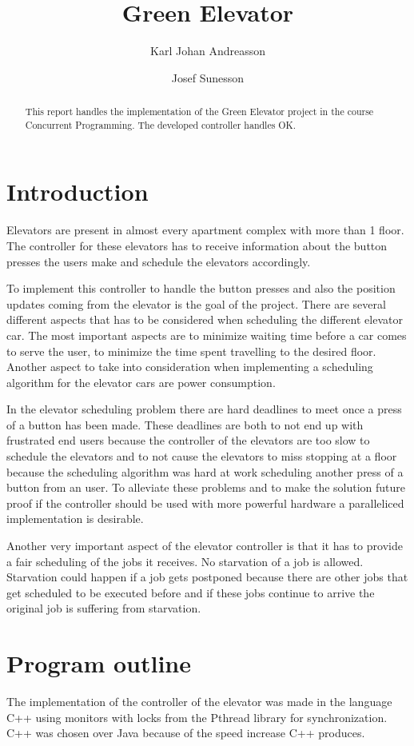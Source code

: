 \documentclass[10pt,a4paper]{article}
\author{Karl Johan Andreasson \and Josef Sunesson}
\title{Green Elevator}
\begin{document}
\maketitle

\begin{abstract} 
This report handles the implementation of the Green Elevator project in the course Concurrent Programming. The developed controller handles OK.
\end{abstract}

\section{Introduction}
Elevators are present in almost every apartment complex with more than 1 floor. The controller for these elevators has to receive information about the button presses the users make and schedule the elevators accordingly.

To implement this controller to handle the button presses and also the position updates coming from the elevator is the goal of the project. There are several different aspects that has to be considered when scheduling the different elevator car. The most important aspects are to minimize waiting time before a car comes to serve the user, to minimize the time spent travelling to the desired floor. Another aspect to take into consideration when implementing a scheduling algorithm for the elevator cars are power consumption.

In the elevator scheduling problem there are hard deadlines to meet once a press of a button has been made. These deadlines are both to not end up with frustrated end users because the controller of the elevators are too slow to schedule the elevators and to not cause the elevators to miss stopping at a floor because the scheduling algorithm was hard at work scheduling another press of a button from an user. To alleviate these problems and to make the solution future proof if the controller should be used with more powerful hardware a paralleliced implementation is desirable.

Another very important aspect of the elevator controller is that it has to provide a fair scheduling of the jobs it receives. No starvation of a job is allowed. Starvation could happen if a job gets postponed because there are other jobs that get scheduled to be executed before and if these jobs continue to arrive the original job is suffering from starvation.

\section{Program outline}
The implementation of the controller of the elevator was made in the language C++ using monitors with locks from the Pthread library for synchronization. C++ was chosen over Java because of the speed increase C++ produces.
\end{document}
